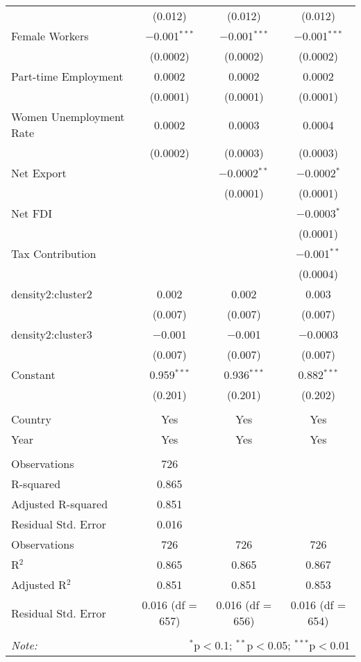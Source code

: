 \begin{table}[!htbp]
\begin{tabular}{@{\extracolsep{5pt}}lccc}
  & (0.012) & (0.012) & (0.012) \\ 
  Female Workers & $-$0.001$^{***}$ & $-$0.001$^{***}$ & $-$0.001$^{***}$ \\ 
  & (0.0002) & (0.0002) & (0.0002) \\ 
  Part-time Employment & 0.0002 & 0.0002 & 0.0002 \\ 
  & (0.0001) & (0.0001) & (0.0001) \\ 
  Women Unemployment Rate & 0.0002 & 0.0003 & 0.0004 \\ 
  & (0.0002) & (0.0003) & (0.0003) \\ 
  Net Export &  & $-$0.0002$^{**}$ & $-$0.0002$^{*}$ \\ 
  &  & (0.0001) & (0.0001) \\ 
  Net FDI &  &  & $-$0.0003$^{*}$ \\ 
  &  &  & (0.0001) \\ 
  Tax Contribution &  &  & $-$0.001$^{**}$ \\ 
  &  &  & (0.0004) \\ 
  density2:cluster2 & 0.002 & 0.002 & 0.003 \\ 
  & (0.007) & (0.007) & (0.007) \\ 
  density2:cluster3 & $-$0.001 & $-$0.001 & $-$0.0003 \\ 
  & (0.007) & (0.007) & (0.007) \\ 
  Constant & 0.959$^{***}$ & 0.936$^{***}$ & 0.882$^{***}$ \\ 
  & (0.201) & (0.201) & (0.202) \\ 
 \hline \\[-1.8ex] 
Country & Yes & Yes & Yes \\ 
Year & Yes & Yes & Yes \\ 
\hline \\[-1.8ex] 
Observations & 726 &  &  \\ 
R-squared & 0.865 &  &  \\ 
Adjusted R-squared & 0.851 &  &  \\ 
Residual Std. Error & 0.016 &  &  \\ 
Observations & 726 & 726 & 726 \\ 
R$^{2}$ & 0.865 & 0.865 & 0.867 \\ 
Adjusted R$^{2}$ & 0.851 & 0.851 & 0.853 \\ 
Residual Std. Error & 0.016 (df = 657) & 0.016 (df = 656) & 0.016 (df = 654) \\ 
\hline 
\hline \\[-1.8ex] 
\textit{Note:}  & \multicolumn{3}{r}{$^{*}$p$<$0.1; $^{**}$p$<$0.05; $^{***}$p$<$0.01} \\ 
\end{tabular} 
\end{table} 
